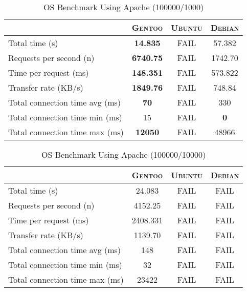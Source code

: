 \begin{table}[ht]
  \centering
  \caption{OS Benchmark Using Apache (100000/1000)}
  \label{tab:os_apache_100000_1000}
  
  \begin{tabular}{l|c|c|c}
    
    & \textbf{\textsc{Gentoo}} & \textbf{\textsc{Ubuntu}} & \textbf{\textsc{Debian}} \\ \hline
    Total time (s) & \textbf{14.835} & FAIL & 57.382 \\ \hline
    Requests per second (n) & \textbf{6740.75} & FAIL & 1742.70 \\ \hline
    Time per request (ms) & \textbf{148.351} & FAIL & 573.822 \\ \hline
    Transfer rate (KB/s) & \textbf{1849.76} & FAIL & 748.84 \\ \hline
    Total connection time avg (ms) & \textbf{70} & FAIL & 330 \\ \hline
    Total connection time min (ms) & 15 & FAIL & \textbf{0} \\ \hline
    Total connection time max (ms) & \textbf{12050} & FAIL & 48966 \\
  \end{tabular}
\end{table}

\begin{table}[ht]
  \centering
  \caption{OS Benchmark Using Apache (100000/10000)}
  \label{tab:os_apache_100000_10000}
  
  \begin{tabular}{l|c|c|c}
  
    & \textbf{\textsc{Gentoo}} & \textbf{\textsc{Ubuntu}} & \textbf{\textsc{Debian}} \\ \hline
    Total time (s) & 24.083 & FAIL & FAIL \\ \hline
    Requests per second (n) & 4152.25 & FAIL & FAIL \\ \hline
    Time per request (ms) & 2408.331 & FAIL & FAIL \\ \hline
    Transfer rate (KB/s) & 1139.70 & FAIL & FAIL \\ \hline
    Total connection time avg (ms) & 148 & FAIL & FAIL \\ \hline
    Total connection time min (ms) & 32 & FAIL & FAIL \\ \hline
    Total connection time max (ms) & 23422 & FAIL & FAIL \\
  \end{tabular}
\end{table}

